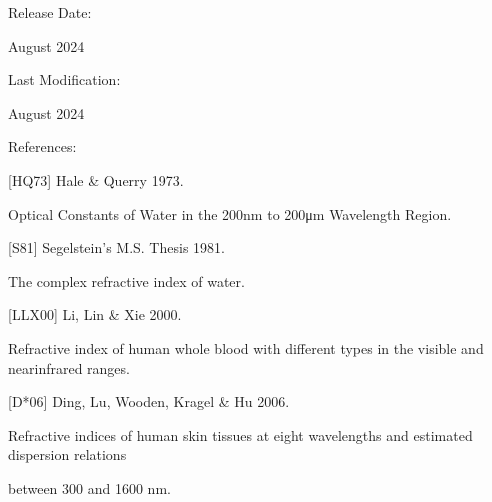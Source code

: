 \documentclass[letterpaper,10pt,english]{sphinxmanual}
\begin{document}
\begin{DUlineblock}{0em}
\item[] Release Date:
\item[] August 2024
\item[] Last Modification:
\item[] August 2024
\end{DUlineblock}

\begin{DUlineblock}{0em}
\item[] References:
\end{DUlineblock}

\begin{DUlineblock}{0em}
\item[] {[}HQ73{]} Hale \& Querry 1973.
\item[] Optical Constants of Water in the 200\sphinxhyphen{}nm to 200\sphinxhyphen{}μm Wavelength Region.
\item[] 
\end{DUlineblock}

\begin{DUlineblock}{0em}
\item[] {[}S81{]} Segelstein’s M.S. Thesis 1981.
\item[] The complex refractive index of water.
\item[] 
\end{DUlineblock}

\begin{DUlineblock}{0em}
\item[] {[}LLX00{]} Li, Lin \& Xie 2000.
\item[] Refractive index of human whole blood with different types in the visible and near\sphinxhyphen{}infrared ranges.
\item[] 
\end{DUlineblock}

\begin{DUlineblock}{0em}
\item[] {[}D*06{]} Ding, Lu, Wooden, Kragel \& Hu 2006.
\item[] Refractive indices of human skin tissues at eight wavelengths and estimated dispersion relations
\item[] between 300 and 1600 nm.
\item[] 
\end{DUlineblock}
\end{document}
